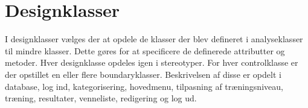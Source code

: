 \section{Designklasser}
I designklasser vælges der at opdele de klasser der blev defineret i analyseklasser til mindre klasser. Dette gøres for at specificere de definerede attributter og metoder. Hver designklasse opdeles igen i stereotyper. For hver controlklasse er der opstillet en eller flere boundaryklasser. Beskrivelsen af disse er opdelt i database, log ind, kategorisering, hovedmenu, tilpasning af træningsniveau, træning, resultater, venneliste, redigering og log ud. 